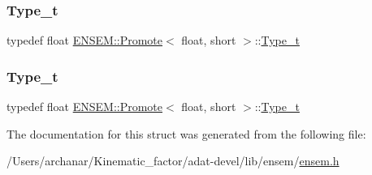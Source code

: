 \mbox{\label{structENSEM_1_1Promote_3_01float_00_01short_01_4_a353d7eb6960736f72669b0ec69c11319}} 
\subsubsection{\texorpdfstring{Type\_t}{Type\_t}\hspace{0.1cm}{\footnotesize\ttfamily [2/3]}}
{\footnotesize\ttfamily typedef float \mbox{\hyperlink{structENSEM_1_1Promote}{E\+N\+S\+E\+M\+::\+Promote}}$<$ float, short $>$\+::\mbox{\hyperlink{structENSEM_1_1Promote_3_01float_00_01short_01_4_a353d7eb6960736f72669b0ec69c11319}{Type\+\_\+t}}}

\mbox{\label{structENSEM_1_1Promote_3_01float_00_01short_01_4_a353d7eb6960736f72669b0ec69c11319}} 
\subsubsection{\texorpdfstring{Type\_t}{Type\_t}\hspace{0.1cm}{\footnotesize\ttfamily [3/3]}}
{\footnotesize\ttfamily typedef float \mbox{\hyperlink{structENSEM_1_1Promote}{E\+N\+S\+E\+M\+::\+Promote}}$<$ float, short $>$\+::\mbox{\hyperlink{structENSEM_1_1Promote_3_01float_00_01short_01_4_a353d7eb6960736f72669b0ec69c11319}{Type\+\_\+t}}}



The documentation for this struct was generated from the following file\+:\begin{DoxyCompactItemize}
\item 
/\+Users/archanar/\+Kinematic\+\_\+factor/adat-\/devel/lib/ensem/\mbox{\hyperlink{adat-devel_2lib_2ensem_2ensem_8h}{ensem.\+h}}\end{DoxyCompactItemize}
